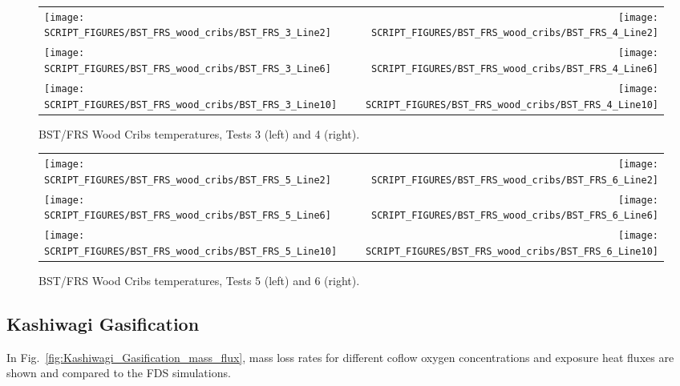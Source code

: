 \begin{figure}[p]
\begin{tabular*}{\textwidth}{l@{\extracolsep{\fill}}r}
\texttt{[image: SCRIPT\_FIGURES/BST\_FRS\_wood\_cribs/BST\_FRS\_3\_Line2]} &
\texttt{[image: SCRIPT\_FIGURES/BST\_FRS\_wood\_cribs/BST\_FRS\_4\_Line2]} \\
\texttt{[image: SCRIPT\_FIGURES/BST\_FRS\_wood\_cribs/BST\_FRS\_3\_Line6]} &
\texttt{[image: SCRIPT\_FIGURES/BST\_FRS\_wood\_cribs/BST\_FRS\_4\_Line6]} \\
\texttt{[image: SCRIPT\_FIGURES/BST\_FRS\_wood\_cribs/BST\_FRS\_3\_Line10]} &
\texttt{[image: SCRIPT\_FIGURES/BST\_FRS\_wood\_cribs/BST\_FRS\_4\_Line10]}
\end{tabular*}
\caption[BST/FRS Wood Cribs temperatures, Tests 3 and 4]{BST/FRS Wood Cribs temperatures, Tests 3 (left) and 4 (right).}
\label{BST_FRS_wood_cribs_Tests_3to4}
\end{figure}

\begin{figure}[p]
\begin{tabular*}{\textwidth}{l@{\extracolsep{\fill}}r}
\texttt{[image: SCRIPT\_FIGURES/BST\_FRS\_wood\_cribs/BST\_FRS\_5\_Line2]} &
\texttt{[image: SCRIPT\_FIGURES/BST\_FRS\_wood\_cribs/BST\_FRS\_6\_Line2]} \\
\texttt{[image: SCRIPT\_FIGURES/BST\_FRS\_wood\_cribs/BST\_FRS\_5\_Line6]} &
\texttt{[image: SCRIPT\_FIGURES/BST\_FRS\_wood\_cribs/BST\_FRS\_6\_Line6]} \\
\texttt{[image: SCRIPT\_FIGURES/BST\_FRS\_wood\_cribs/BST\_FRS\_5\_Line10]} &
\texttt{[image: SCRIPT\_FIGURES/BST\_FRS\_wood\_cribs/BST\_FRS\_6\_Line10]}
\end{tabular*}
\caption[BST/FRS Wood Cribs temperatures, Tests 5 and 6]{BST/FRS Wood Cribs temperatures, Tests 5 (left) and 6 (right).}
\label{BST_FRS_wood_cribs_Tests_5to6}
\end{figure}

\clearpage

\subsection{Kashiwagi Gasification}
\label{Kashiwagi_Gasification}

In Fig.~\ref{fig:Kashiwagi_Gasification_mass_flux}, mass loss rates for different coflow oxygen concentrations and exposure heat fluxes are shown and compared to the FDS simulations.

